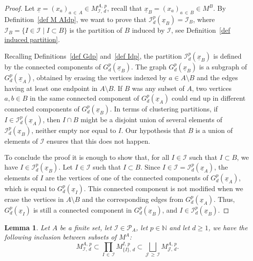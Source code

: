 \documentclass[10pt]{amsart}
\newtheorem{lemm}[theo]{Lemma}\newtheorem{prop}[theo]{Proposition}\newtheorem{coro}[theo]{Corollary}\newtheorem{conj}[theo]{Conjecture}
\theoremstyle{definition}\newtheorem{defi}[theo]{Definition}\newtheorem{rema}[theo]{Remark}\newtheorem{exam}[theo]{Example}\newtheorem{exem}[theo]{Example}\newtheorem{nota}[theo]{Notation}
\newcommand{\I}{\mathcal{I}}
\newcommand{\J}{\mathcal{J}}
\newcommand{\pa}{\mathcal{P}\!}
\newcommand{\N}{\mathbb{N}}
\renewcommand{\geq}{\geqslant}
\begin{document}
\begin{proof}
Let $\underline{x} = (x_a)_{a\,\in\,A} \in M^{A,\,p}_{\I,\,d}$, recall that $\underline{x}_B = (x_a)_{a\,\in\,B} \in M^B$. By Definition~\ref{def M AIdp}, we want to prove that $\I^p_d(\underline{x}_B) = \I_B$, where $\I_B = \{I \in \I \mid I \subset B\}$ is the partition of $B$ induced by $\I$, see Definition~\ref{def induced partition}.

Recalling Definitions~\ref{def Gdp} and~\ref{def Idp}, the partition $\I^p_d(\underline{x}_B)$ is defined by the connected components of $G^p_d(\underline{x}_B)$. The graph $G^p_d(\underline{x}_B)$ is a subgraph of $G^p_d(\underline{x}_A)$, obtained by erasing the vertices indexed by $a \in A \setminus B$ and the edges having at least one endpoint in $A \setminus B$. If $B$ was any subset of $A$, two vertices $a,b \in B$ in the same connected component of $G^p_d(\underline{x}_A)$ could end up in different connected components of $G^p_d(\underline{x}_B)$. In terms of clustering partitions, if $I \in \I_d^p(\underline{x}_A)$, then $I \cap B$ might be a disjoint union of several elements of $\I_d^p(\underline{x}_B)$, neither empty nor equal to $I$. Our hypothesis that $B$ is a union of elements of $\I$ ensures that this does not happen.

To conclude the proof it is enough to show that, for all $I \in \I$ such that $I \subset B$, we have $I \in \I_d^p(\underline{x}_B)$. Let $I \in \I$ such that $I \subset B$. Since $I \in \I = \I_d^p(\underline{x}_A)$, the elements of $I$ are the vertices of one of the connected components of $G_d^p(\underline{x}_A)$, which is equal to $G_d^p(\underline{x}_I)$. This connected component is not modified when we erase the vertices in $A \setminus B$ and the corresponding edges from $G_d^p(\underline{x}_A)$. Thus, $G_d^p(\underline{x}_I)$ is still a connected component in $G_d^p(\underline{x}_B)$, and $I \in \I_d^p(\underline{x}_B)$.
\end{proof}

\begin{lemm}\label{lem M AIdp blurred}
Let $A$ be a finite set, let $\I \in \pa_A$, let $p \in \N$ and let $d \geq 1$, we have the following inclusion between subsets of $M^A$:
\[
M^{A,\,p}_{\I,\,d} \subset \prod_{I\,\in\,\I} M^{I,\,p}_{\{I\},\,d} \subset \bigsqcup_{\J\,\geq\,\I} M^{A,\,p}_{\J,\,d}.
\]
\end{lemm}
\end{document}
